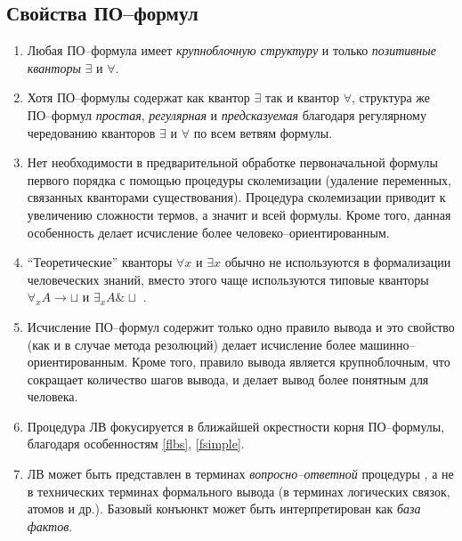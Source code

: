\subsection{Свойства ПО--формул}

\begin{enumerate}
\item\label{flbs} Любая ПО--формула имеет {\em крупноблочную структуру} и только {\em позитивные кванторы} $\exists$ и $\forall$.
%
\item\label{fsimple} Хотя ПО--формулы содержат как квантор $\exists$ так и квантор $\forall$, структура же ПО--формул {\em простая}, {\em регулярная} и {\em предсказуемая} благодаря регулярному чередованию кванторов $\exists$ и $\forall$ по всем ветвям формулы.
%
\item Нет необходимости в предварительной обработке первоначальной формулы первого порядка с помощью процедуры сколемизации (удаление переменных, связанных кванторами существования). Процедура сколемизации приводит к увеличению сложности термов, а значит и всей формулы. Кроме того, данная особенность делает исчисление более человеко--ориентированным.
%
\item ``Теоретические'' кванторы $\forall x$ и $\exists x$ обычно не используются в формализации человеческих знаний, вместо этого чаще используются типовые кванторы $\forall_x A \rightarrow \sqcup$ и $\exists_x A \& \sqcup$ \cite{Bourbaki, ICDS2000, NNN}.
%
\item\label{frule} Исчисление ПО--формул содержит только одно правило вывода и это свойство (как и в случае метода резолюций) делает исчисление более машинно--ориентированным. Кроме того, правило вывода является крупноблочным, что сокращает количество шагов вывода, и делает вывод более понятным для человека.
%
\item\label{froot} Процедура ЛВ фокусируется в ближайшей окрестности корня ПО--фор\-му\-лы, благодаря особенностям \ref{flbs}, \ref{fsimple}.
%
\item\label{fqa} ЛВ может быть представлен в терминах {\em вопросно--ответной} процедуры \cite{ICDS2000}, а не в технических терминах формального вывода (в терминах логических связок, атомов и др.). Базовый конъюнкт может быть интерпретирован как {\em база фактов}.

\end{enumerate}
